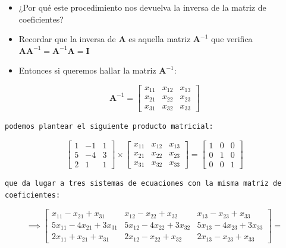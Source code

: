 \documentclass[openany]{book}
\providecommand{\tightlist}{%
  \setlength{\itemsep}{0pt}\setlength{\parskip}{0pt}}
\begin{document}
\begin{itemize}
\tightlist
\item
  ¿Por qué este procedimiento nos devuelva la inversa de la matriz de coeficientes?
\item
  Recordar que la inversa de \(\mathbf{A}\) es aquella matriz \(\mathbf{A}^{-1}\) que verifica \(\mathbf{AA}^{-1} =\mathbf{A}^{-1}\mathbf{A}=\mathbf{I}\)
\item
  Entonces si queremos hallar la matriz \(\mathbf{A}^{-1}\):
\end{itemize}

\[
\mathbf{A}^{-1} =
\begin{bmatrix}
x_{11} & x_{12} & x_{13} \\
x_{21} & x_{22} & x_{23} \\
x_{31} & x_{32} & x_{33} 
\end{bmatrix}
\]

\begin{verbatim}
podemos plantear el siguiente producto matricial:
\end{verbatim}

\[
\begin{bmatrix}
1 & -1 & 1 \\
5 & -4 & 3 \\
2 & 1 & 1 
\end{bmatrix}
\times
\begin{bmatrix}
x_{11} & x_{12} & x_{13} \\
x_{21} & x_{22} & x_{23} \\
x_{31} & x_{32} & x_{33} 
\end{bmatrix}
=
\begin{bmatrix}
1 & 0 & 0 \\
0 & 1 & 0 \\
0 & 0 & 1 
\end{bmatrix}
\]

\begin{verbatim}
que da lugar a tres sistemas de ecuaciones con la misma matriz de coeficientes:
\end{verbatim}

\[
\implies
\begin{bmatrix}
x_{11}-x_{21}+x_{31} & x_{12}-x_{22}+x_{32} & x_{13}-x_{23}+x_{33} \\
5x_{11}-4x_{21}+3x_{31} & 5x_{12}-4x_{22}+3x_{32} & 5x_{13}-4x_{23}+3x_{33} \\
2x_{11}+x_{21}+x_{31} & 2x_{12}-x_{22}+x_{32} & 2x_{13}-x_{23}+x_{33} 
\end{bmatrix}
=
\]
\end{document}
